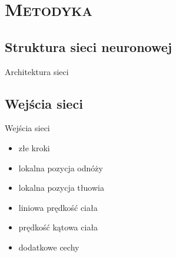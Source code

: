 \documentclass[xcolor=x11names,compress]{beamer}
\renewcommand{\(}{\begin{columns}}
\renewcommand{\)}{\end{columns}}
\newcommand{\<}[1]{\begin{column}{#1}}
\renewcommand{\>}{\end{column}}
\begin{document}
\section{\scshape Metodyka}
\subsection{Struktura sieci neuronowej}
\begin{frame}{Architektura sieci}
{
\begin{frame}
     \end{frame}
}

\end{frame}
\subsection{Wejścia sieci}
\begin{frame}{Wejścia sieci}

\begin{itemize}
\item złe kroki
\item lokalna pozycja odnóży
\item lokalna pozycja tłuowia
\item liniowa prędkość ciała
\item prędkość kątowa ciała
\item dodatkowe cechy

\end{itemize}

\end{frame}
\end{document}
